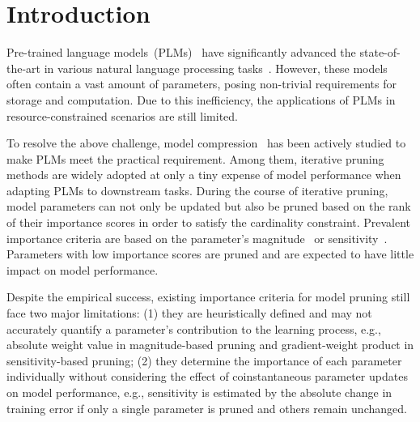 \section{Introduction}



Pre-trained language models~(PLMs)~\cite{bert,gpt2} have significantly advanced the state-of-the-art in various natural language processing tasks~\cite{glue,webnlg,e2e,dart}. However, these models often contain a vast amount of parameters, posing non-trivial requirements for storage and computation. Due to this inefficiency, the applications of PLMs in resource-constrained scenarios are still limited.




To resolve the above challenge, model compression~\cite{pkd,svd,albert} has been actively studied to make PLMs meet the practical requirement. Among them, iterative pruning methods are widely adopted at only a tiny expense of model performance when adapting PLMs to downstream tasks. 
During the course of iterative pruning, model parameters can not only be updated but also be pruned based on the rank of their importance scores in order to satisfy the cardinality constraint.
Prevalent importance criteria are based on the parameter's magnitude~\cite{gupta,mag2} or sensitivity~\cite{l0,movement,superticket,platon}. Parameters with low importance scores are pruned and are expected to have little impact on model performance.






Despite the empirical success, existing importance criteria for model pruning still face two major limitations: (1) they are heuristically defined and may not accurately quantify a parameter's contribution to the learning process, e.g., absolute weight value in magnitude-based pruning and gradient-weight product in sensitivity-based pruning; (2) they determine the importance of each parameter individually without considering the effect of coinstantaneous parameter updates on model performance, e.g., sensitivity is estimated by the absolute change in training error if only a single parameter is pruned and others remain unchanged.

